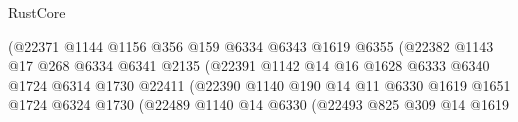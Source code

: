\begin{lexlean}{RustCore}
\begin{coremodule}
                                            (@22371
                                              @1144
                                              @1156
                                              @356
                                              @159
                                              @6334
                                              @6343
                                              @1619
                                              @6355
                                              (@22382
                                                @1143
                                                @17
                                                @268
                                                @6334
                                                @6341
                                                @2135
                                                (@22391
                                                  @1142
                                                  @14
                                                  @16
                                                  @1628
                                                  @6333
                                                  @6340
                                                  @1724
                                                  @6314
                                                  @1730
                                                  @22411
                                                  (@22390
                                                    @1140
                                                    @190
                                                    @14
                                                    @11
                                                    @6330
                                                    @1619
                                                    @1651
                                                    @1724
                                                    @6324
                                                    @1730
                                                    (@22489
                                                      @1140
                                                      @14
                                                      @6330
                                                      (@22493
                                                        @825
                                                        @309
                                                        @14
                                                        @1619

\end{coremodule}
\end{lexlean}
